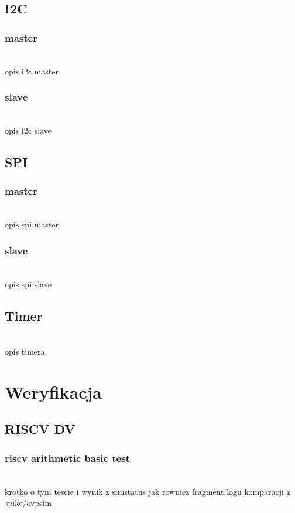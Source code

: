 \documentclass[11pt,a4paper]{article}
\begin{document}
	\subsection{I2C}
		\subsubsection{master}
		\hspace{5mm}
			\\opis i2c master
		\subsubsection{slave}
		\hspace{5mm}
			\\opis i2c slave

	\subsection{SPI}
		\subsubsection{master}
		\hspace{5mm}
			\\opis spi master
		\subsubsection{slave}
		\hspace{5mm}
			\\opis spi slave

	\subsection{Timer}
	\hspace{5mm}
		\\opis timera


\newpage
\section{Weryfikacja}

	\subsection{RISCV DV}
		\subsubsection{riscv arithmetic basic test}
		\hspace{5mm}
			\\krotko o tym tescie i wynik z simstatus jak rowniez fragment logu komparacji z spike/ovpsim
			
\end{document}
